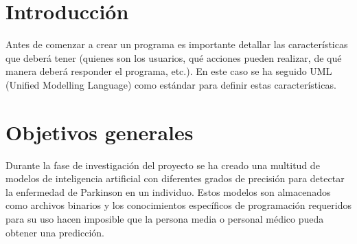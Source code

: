 \setcounter{ncu}{0}
\newcommand{\cu}[9]{
    \addtocounter{ncu}{1}

    \begin{table}[p]
        \centering
        \begin{tabularx}{\linewidth}{ p{0.21\columnwidth} p{0.71\columnwidth} }
            \toprule
            \textbf{CU-\arabic{ncu}}      & \textbf{#1} \\
            \toprule
            \textbf{Versión}              & #2          \\
            \textbf{Autor}                & \theauthor  \\
            \textbf{Requisitos asociados} & #3          \\
            \textbf{Descripción}          & #4          \\
            \textbf{Precondición}         & #5          \\
            \textbf{Acciones}             & #6          \\
            \textbf{Postcondición}        & #7          \\
            \textbf{Excepciones}          & #8          \\
            \textbf{Importancia}          & #9          \\
            \bottomrule
        \end{tabularx}
        \caption{CU-\arabic{ncu} #1.}
    \end{table}
}


\label{cha:Especificación de Requisitos}

\section{Introducción}

Antes de comenzar a crear un programa es importante detallar las características
que deberá tener (quienes son los usuarios, qué acciones pueden realizar, de qué
manera deberá responder el programa, etc.). En este caso se ha seguido UML
(Unified Modelling Language) como estándar para definir estas características.

\section{Objetivos generales}

Durante la fase de investigación del proyecto se ha creado una multitud de
modelos de inteligencia artificial con diferentes grados de precisión para
detectar la enfermedad de Parkinson en un individuo. Estos modelos son
almacenados como archivos binarios y los conocimientos específicos de
programación requeridos para su uso hacen imposible que la persona media o
personal médico pueda obtener una predicción.

